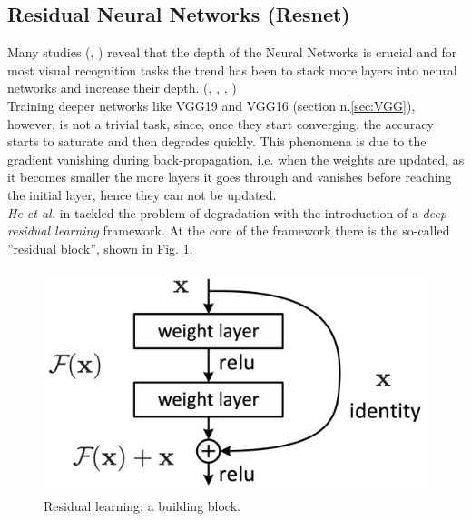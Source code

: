 \subsection[Residual Neural Networks]{Residual Neural Networks (Resnet)}
Many studies (\citep{simonyan2015deep}, \cite{szegedy2014going}) reveal that the depth of the Neural Networks is crucial and for most visual recognition tasks the trend has been to stack more layers into neural networks and increase their depth. (\cite{simonyan2015deep}, \cite{ioffe2015batch}, \cite{girshick2014rich}, \cite{2014Spatial})\\
Training deeper networks like VGG19 and VGG16 (section n.\ref{sec:VGG}), however, is not a trivial task, since, once they start converging, the accuracy starts to saturate and then degrades quickly. This phenomena is due to the gradient vanishing during back-propagation, i.e. when the weights are updated, as it becomes smaller the more layers it goes through and vanishes before reaching the initial layer, hence they can not be updated.  \\
\textit{He et al. } in \cite{DBLP:journals/corr/HeZRS15} tackled the problem of degradation with the introduction of a \textit{deep residual learning} framework. At the core of the framework there is the so-called ''residual block'', shown in Fig. \ref{fig:res_block}. 
\begin{figure}[htb]
    \centering
    \includegraphics[scale = 0.3]{img/res_block.png}
    \caption[Residual learning: a building block]{Residual learning: a building block. \cite{DBLP:journals/corr/HeZRS15}}
    \label{fig:res_block}
\end{figure}

